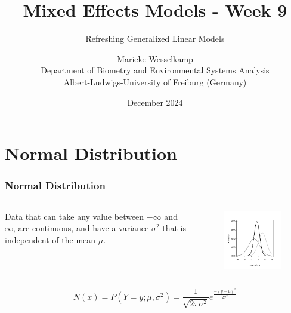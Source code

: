 \documentclass{beamer}
\title{Mixed Effects Models - Week 9}
\subtitle{Refreshing Generalized Linear Models}
\author{Marieke Wesselkamp\\Department of Biometry and Environmental Systems Analysis\\Albert-Ludwigs-University of Freiburg (Germany)}
\date{December 2024}
\begin{document}
\frame{\titlepage}

\section{Normal Distribution}

\begin{frame}[fragile]
    \frametitle{Normal Distribution}
    \large
    \begin{columns}
        \begin{column}{0.5\textwidth}
            Data that can take any value between $-\infty$ and $\infty$, are continuous, and have a variance $\sigma^2$ that is independent of the mean $\mu$.
        \end{column}
        \begin{column}{0.5\textwidth}
            \begin{figure}
            \centering
            \includegraphics[width=\textwidth]{lectures/day_9_refreshing_glm/figures/unnamed-chunk-2-1.png}
            \end{figure}
        \end{column}
    \end{columns}
    \vspace{0.3cm}
    
    \[
    N(x) = P(Y = y; \mu, \sigma^2) = \frac{1}{\sqrt{2 \pi \sigma^2}} e^{\frac{-(y - \mu)^2}{2 \sigma^2}}
    \]
\end{frame}
\end{document}
